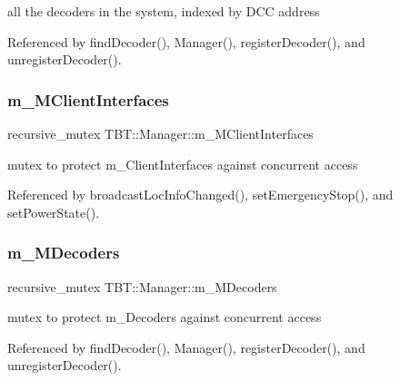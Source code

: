 all the decoders in the system, indexed by D\+CC address 



Referenced by find\+Decoder(), Manager(), register\+Decoder(), and unregister\+Decoder().

\mbox{\label{classTBT_1_1Manager_a07202ce2904cf24a4b5127ff12d54834_a07202ce2904cf24a4b5127ff12d54834}} 
\subsubsection{\texorpdfstring{m\+\_\+\+M\+Client\+Interfaces}{m\_MClientInterfaces}}
{\footnotesize\ttfamily recursive\+\_\+mutex T\+B\+T\+::\+Manager\+::m\+\_\+\+M\+Client\+Interfaces\hspace{0.3cm}{\ttfamily [private]}}



mutex to protect m\+\_\+\+Client\+Interfaces against concurrent access 



Referenced by broadcast\+Loc\+Info\+Changed(), set\+Emergency\+Stop(), and set\+Power\+State().

\mbox{\label{classTBT_1_1Manager_a784fe0e0a20a0c7d0832186abe245f78_a784fe0e0a20a0c7d0832186abe245f78}} 
\subsubsection{\texorpdfstring{m\+\_\+\+M\+Decoders}{m\_MDecoders}}
{\footnotesize\ttfamily recursive\+\_\+mutex T\+B\+T\+::\+Manager\+::m\+\_\+\+M\+Decoders\hspace{0.3cm}{\ttfamily [private]}}



mutex to protect m\+\_\+\+Decoders against concurrent access 



Referenced by find\+Decoder(), Manager(), register\+Decoder(), and unregister\+Decoder().

